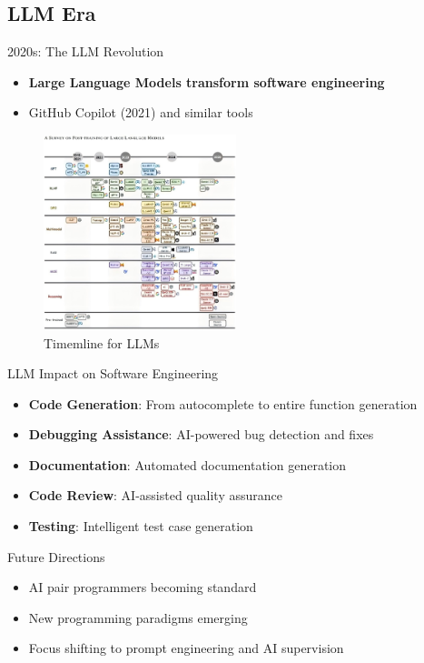 \documentclass{beamer}
\begin{document}
\subsection{LLM Era}

\begin{frame}[t]{2020s: The LLM Revolution}
    \begin{itemize}
        \item \textbf{Large Language Models transform software engineering}
        \item GitHub Copilot (2021) and similar tools
    \end{itemize}
    \begin{figure}
        \includegraphics[width=0.5\textwidth]{images/timeline.jpg}
        \caption{Timemline for LLMs}
    \end{figure}
\end{frame}

\begin{frame}[t]{LLM Impact on Software Engineering}
\begin{itemize}
    \item \textbf{Code Generation}: From autocomplete to entire function generation
    \item \textbf{Debugging Assistance}: AI-powered bug detection and fixes
    \item \textbf{Documentation}: Automated documentation generation
    \item \textbf{Code Review}: AI-assisted quality assurance
    \item \textbf{Testing}: Intelligent test case generation
\end{itemize}
\begin{block}{Future Directions}
\begin{itemize}
    \item AI pair programmers becoming standard
    \item New programming paradigms emerging
    \item Focus shifting to prompt engineering and AI supervision
\end{itemize}
\end{block}
\end{frame}
\end{document}
